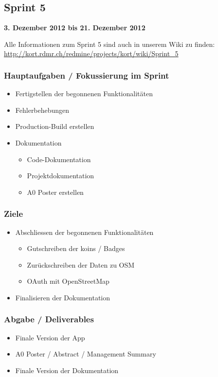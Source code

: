\subsection{Sprint 5}

\textbf{3. Dezember 2012 bis 21. Dezember 2012}

Alle Informationen zum Sprint 5 sind auch in unserem Wiki zu finden:
\url{http://kort.rdmr.ch/redmine/projects/kort/wiki/Sprint_5}

\subsubsection{Hauptaufgaben / Fokussierung im Sprint}

\begin{itemize}
	\item Fertigstellen der begonnenen Funktionalitäten
	\item Fehlerbehebungen
	\item Production-Build erstellen
	\item Dokumentation
	\begin{itemize}
		\item Code-Dokumentation
		\item Projektdokumentation
		\item A0 Poster erstellen
	\end{itemize}
\end{itemize}

\subsubsection{Ziele}
\begin{itemize}
	\item Abschliessen der begonnenen Funktionalitäten
	\begin{itemize}
		\item Gutschreiben der koins / Badges
		\item Zurückschreiben der Daten zu OSM
		\item OAuth mit OpenStreetMap
	\end{itemize}
	\item Finalisieren der Dokumentation
\end{itemize}

\subsubsection{Abgabe / Deliverables}

\begin{itemize}
	\item Finale Version der App
	\item A0 Poster / Abstract / Management Summary
	\item Finale Version der Dokumentation
\end{itemize}


